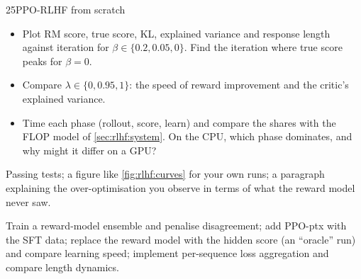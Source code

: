 \begin{labbox}{25}{PPO-RLHF from scratch}
\begin{itemize}
  \item Plot RM score, true score, KL, explained variance and response length against iteration for
        $\beta\in\{0.2, 0.05, 0\}$. Find the iteration where true score peaks for $\beta=0$.
  \item Compare $\lambda\in\{0, 0.95, 1\}$: the speed of reward improvement and the critic's explained variance.
  \item Time each phase (rollout, score, learn) and compare the shares with the FLOP model of
        \cref{sec:rlhf:system}. On the CPU, which phase dominates, and why might it differ on a GPU?
\end{itemize}

Passing tests; a figure like \cref{fig:rlhf:curves} for your own runs; a paragraph explaining the
over-optimisation you observe in terms of what the reward model never saw.

Train a reward-model ensemble and penalise disagreement; add PPO-ptx with the SFT data; replace the reward
model with the hidden score (an ``oracle'' run) and compare learning speed; implement per-sequence loss
aggregation and compare length dynamics.
\end{labbox}
